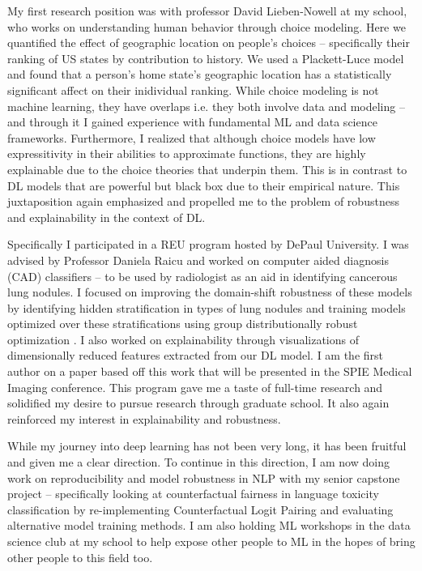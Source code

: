 \documentclass[12pt]{article}
\begin{document}
My first research position was with professor David Lieben-Nowell at my school, who works on understanding human behavior through choice modeling. Here we quantified the effect of geographic location on people's choices -- specifically their ranking of US states by contribution to history. We used a Plackett-Luce model and found that a person's home state's geographic location has a statistically significant affect on their inidividual ranking.
While choice modeling is not machine learning, they have overlaps i.e. they both involve data and modeling -- and through it I gained experience with fundamental ML and data science frameworks. 
Furthermore, I realized that although choice models have low expressitivity in their abilities to approximate functions, they are highly explainable due to the choice theories that underpin them. This is in contrast to DL models that are powerful but black box due to their empirical nature. This juxtaposition again emphasized and propelled me to the problem of robustness and explainability in the context of DL.

 Specifically I participated in a REU program hosted by DePaul University. I was advised by Professor Daniela Raicu and worked on computer aided diagnosis (CAD) classifiers -- to be used by radiologist as an aid in identifying cancerous lung nodules. I focused on improving the domain-shift robustness of these models by identifying hidden stratification in types of lung nodules and training models optimized over these stratifications using group distributionally robust optimization \cite{Sagawa*2020Distributionally}. I also worked on explainability through visualizations of dimensionally reduced features extracted from our DL model. I am the first author on a paper based off this work that will be presented in the SPIE Medical Imaging conference. This program gave me a taste of full-time research and solidified my desire to pursue research through graduate school.
It also again reinforced my interest in explainability and robustness.
 
While my journey into deep learning has not been very long, it has been fruitful and given me a clear direction.
To continue in this direction, I am now doing work on reproducibility and model robustness in NLP with my senior capstone project -- specifically looking at counterfactual fairness in language toxicity classification by re-implementing Counterfactual Logit Pairing \cite{garg2019counterfactual} and evaluating alternative model training methods. I am also holding ML workshops in the data science club at my school to help expose other people to ML in the hopes of bring other people to this field too.
\end{document}
